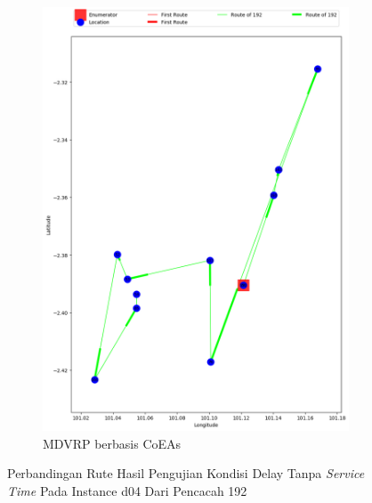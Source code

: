 \begin{figure}[H]
	\centering
	\begin{subfigure}[t]{\textwidth}
		\centering
		\includegraphics[width=\textwidth]{Resources/Images/delayed_4/real_m15_n100_delayed_4_192_coes}
		\caption{MDVRP berbasis CoEAs}
		\label{fig:real_m15_n100_delayed_4_192_coes}
	\end{subfigure}
	\caption{Perbandingan Rute Hasil Pengujian Kondisi Delay Tanpa \textit{Service Time} Pada Instance d04 Dari Pencacah 192}
	\label{fig:real_m15_n100_delayed_4_192}
\end{figure}


